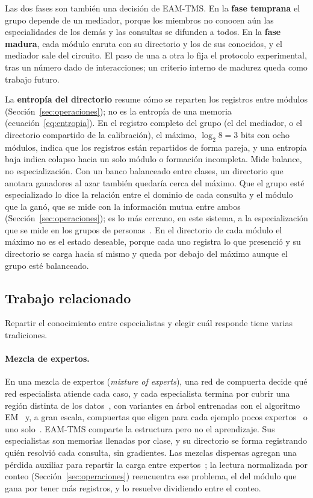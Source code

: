 Las dos fases son también una decisión de EAM-TMS.
En la \textbf{fase temprana} el grupo depende de un mediador, porque los miembros no
conocen aún las especialidades de los demás y las consultas se difunden a todos.
En la \textbf{fase madura}, cada módulo enruta con su directorio y los de sus
conocidos, y el mediador sale del circuito.
El paso de una a otra lo fija el protocolo experimental, tras un número dado de
interacciones; un criterio interno de madurez queda como trabajo futuro.

La \textbf{entropía del directorio} resume cómo se reparten los registros entre
módulos (Sección~\ref{sec:operaciones}); no es la entropía de una memoria
(ecuación~\eqref{eq:entropia}).
En el registro completo del grupo (el del mediador, o el directorio compartido de la
calibración), el máximo, $\log_2 8 = 3$ bits con ocho módulos, indica que los registros
están repartidos de forma pareja, y una entropía baja indica colapso hacia un solo
módulo o formación incompleta.
Mide balance, no especialización.
Con un banco balanceado entre clases, un directorio
que anotara ganadores al azar también quedaría cerca del máximo.
Que el grupo esté especializado lo dice la relación entre el dominio de cada consulta y
el módulo que la ganó, que se mide con la información mutua entre ambos
(Sección~\ref{sec:operaciones}); es lo más cercano, en este sistema, a la
especialización que se mide en los grupos de personas~\cite{austin2003transactive}.
En el directorio de cada módulo el máximo no es el estado deseable, porque cada uno
registra lo que presenció y su directorio se carga hacia sí mismo y queda por debajo del
máximo aunque el grupo esté balanceado.

\subsection{Trabajo relacionado}
\label{sec:trabajo-relacionado}

Repartir el conocimiento entre especialistas y elegir cuál responde tiene varias
tradiciones.

\paragraph{Mezcla de expertos.}
En una mezcla de expertos (\textit{mixture of experts}), una red de compuerta decide qué red
especialista atiende cada caso, y cada especialista termina por cubrir una región
distinta de los datos~\cite{jacobs1991adaptive}, con variantes en árbol entrenadas con el algoritmo
EM~\cite{jordan1994hierarchical} y, a gran escala, compuertas que eligen para cada
ejemplo pocos expertos~\cite{shazeer2017outrageously} o uno solo~\cite{fedus2022switch}.
EAM-TMS comparte la estructura pero no el aprendizaje.
Sus especialistas son memorias
llenadas por clase, y su directorio se forma registrando quién resolvió cada consulta,
sin gradientes.
Las mezclas dispersas agregan una pérdida auxiliar para repartir la carga entre
expertos~\cite{fedus2022switch}; la lectura normalizada por conteo
(Sección~\ref{sec:operaciones}) reencuentra ese problema, el del módulo que gana por
tener más registros, y lo resuelve dividiendo entre el conteo.

